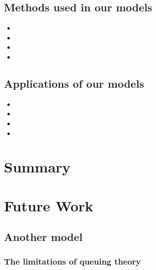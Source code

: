 \documentclass{apmcmthesis}
\begin{document}
\subsection{Methods used in our models}
\begin{itemize}
\item 	
\item
\item
\item
\end{itemize}
\subsection{Applications of our models}
\begin{itemize}
\item 	
\item
\item
\item
\end{itemize}

\section{Summary}



\section{Future Work}
\subsection{Another model}
\subsubsection{The limitations of queuing theory}




\subsubsection{}


\subsubsection{}



\subsubsection{}
\end{document}
